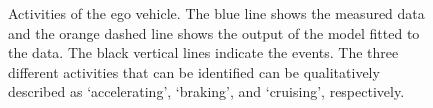\begin{figure}
	\centering
	\setlength\figureheight{150pt}
	\setlength\figurewidth{248pt}
	
	\caption{Activities of the ego vehicle. The blue line shows the measured data and the orange dashed line shows the output of the model fitted to the data. The black vertical lines indicate the events. The three different activities that can be identified can be qualitatively described as `accelerating', `braking', and `cruising', respectively.}
	\label{fig:example ego states}
\end{figure}



%	
